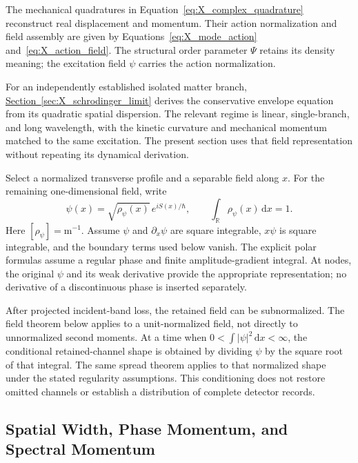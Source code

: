 The mechanical quadratures in Equation~\eqref{eq:X_complex_quadrature} reconstruct real displacement and momentum. Their action normalization and field assembly are given by Equations~\eqref{eq:X_mode_action} and~\eqref{eq:X_action_field}. The structural order parameter $\Psi$ retains its density meaning; the excitation field $\psi$ carries the action normalization.

For an independently established isolated matter branch, \hyperref[sec:X_schrodinger_limit]{Section~\ref*{sec:X_schrodinger_limit}} derives the conservative envelope equation from its quadratic spatial dispersion. The relevant regime is linear, single-branch, and long wavelength, with the kinetic curvature and mechanical momentum matched to the same excitation. The present section uses that field representation without repeating its dynamical derivation.

Select a normalized transverse profile and a separable field along $x$. For the remaining one-dimensional field, write
\begin{equation}
 \psi(x)=\sqrt{\rho_\psi(x)}\,e^{iS(x)/\hbar},
 \qquad
 \int_{\mathbb R}\rho_\psi(x)\,\mathrm dx=1.
\label{eq:DMR_normalized_field}
\end{equation}
Here $[\rho_\psi]=\mathrm{m^{-1}}$. Assume $\psi$ and $\partial_x\psi$ are square integrable, $x\psi$ is square integrable, and the boundary terms used below vanish. The explicit polar formulas assume a regular phase and finite amplitude-gradient integral. At nodes, the original $\psi$ and its weak derivative provide the appropriate representation; no derivative of a discontinuous phase is inserted separately.

After projected incident-band loss, the retained field can be subnormalized. The field theorem below applies to a unit-normalized field, not directly to unnormalized second moments. At a time when $0<\int|\psi|^2\,\mathrm dx<\infty$, the conditional retained-channel shape is obtained by dividing $\psi$ by the square root of that integral. The same spread theorem applies to that normalized shape under the stated regularity assumptions. This conditioning does not restore omitted channels or establish a distribution of complete detector records.

\subsection{Spatial Width, Phase Momentum, and Spectral Momentum}

